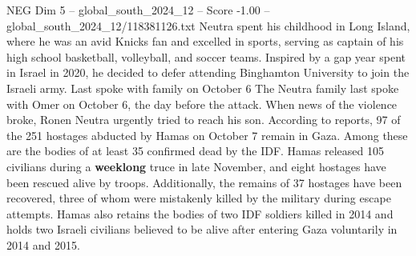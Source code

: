 \begin{textsample}{NEG Dim 5 – global\_south\_2024\_12 – Score -1.00 – global\_south\_2024\_12/118381126.txt}
Neutra spent his childhood in Long Island, where he was an avid Knicks fan and excelled in sports, serving as captain of his high school basketball, volleyball, and soccer teams.
Inspired by a gap year spent in Israel in 2020, he decided to defer attending Binghamton University to join the Israeli army.
Last spoke with family on October 6 The Neutra family last spoke with Omer on October 6, the day before the attack.
When news of the violence broke, Ronen Neutra urgently tried to reach his son.
According to reports, 97 of the 251 hostages abducted by Hamas on October 7 remain in Gaza.
Among these are the bodies of at least 35 confirmed dead by the IDF.
Hamas released 105 civilians during a \textbf{weeklong} truce in late November, and eight hostages have been rescued alive by troops.
Additionally, the remains of 37 hostages have been recovered, three of whom were mistakenly killed by the military during escape attempts.
Hamas also retains the bodies of two IDF soldiers killed in 2014 and holds two Israeli civilians believed to be alive after entering Gaza voluntarily in 2014 and 2015.

\end{textsample}
